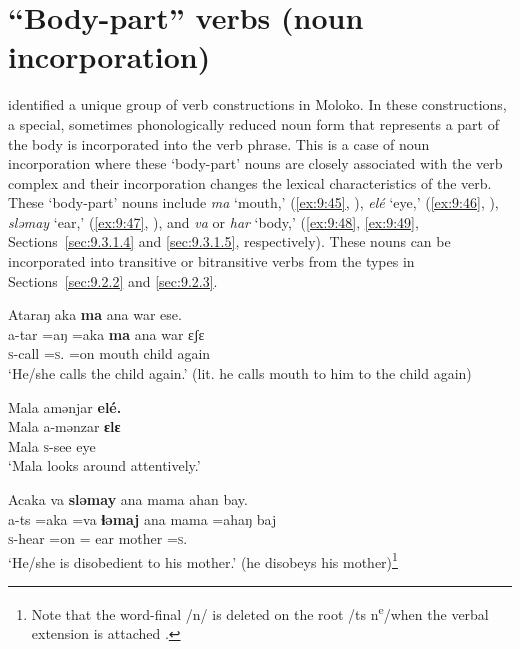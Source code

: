 \section{“Body-part” verbs (noun incorporation)}\label{sec:9.3}
\hypertarget{RefHeading1212761525720847}{}
\citet{FriesenMamalis2008} identified a unique group of verb constructions in Moloko. In these constructions, a special, sometimes phonologically reduced noun form that represents a part of the body is incorporated into the verb phrase.  This is a case of noun incorporation where these ‘body-part’ nouns are closely associated with the verb complex and their incorporation changes the lexical characteristics of the verb. These ‘body-part’ nouns include \textit{ma} ‘mouth,’ (\ref{ex:9:45}, ), \textit{elé} ‘eye,’ (\ref{ex:9:46}, ), \textit{sləmay} ‘ear,’ (\ref{ex:9:47}, ), and \textit{va} or \textit{har} ‘body,’ (\ref{ex:9:48}, \ref{ex:9:49}, Sections~\ref{sec:9.3.1.4} and \ref{sec:9.3.1.5}, respectively). These nouns can be incorporated into transitive or bitransitive verbs from the types in Sections~\ref{sec:9.2.2} and \ref{sec:9.2.3}.

\ea \label{ex:9:45}
Ataraŋ  aka  \textbf{ma}  ana  war  ese.\\
\gll  a-tar =aŋ     =aka   \textbf{ma}  ana  war  ɛʃɛ\\
      \textsc{s}-call =\textsc{s}.{\IO}  =on  mouth  {\DAT} child  again\\
\glt  ‘He/she calls the child again.’ (lit. he calls mouth to him to the child again)
\z

\ea \label{ex:9:46}
Mala  amənjar  \textbf{elé.}\\
\gll  Mala   a-mənzar   \textbf{ɛlɛ}\\
      Mala   \textsc{s}-see    eye\\
\glt  ‘Mala looks around attentively.’ 
\z

\ea \label{ex:9:47}
Acaka  va  \textbf{sləmay}  ana  mama  ahan  bay.\\
\gll  a-ts    =aka  =va  \textbf{ɬəmaj}   ana  mama  =ahaŋ    baj\\
      \textsc{s}-hear  =on  ={\PRF}  ear  {\DAT} mother  =\textsc{s}.{\POSS}  {\NEG}\\
\glt  ‘He/she is disobedient to his mother.’ (he disobeys his mother)\footnote{Note that the word-final /n/ is deleted on the root /ts n\textsuperscript{e}/when the verbal extension is attached .} 
\z

